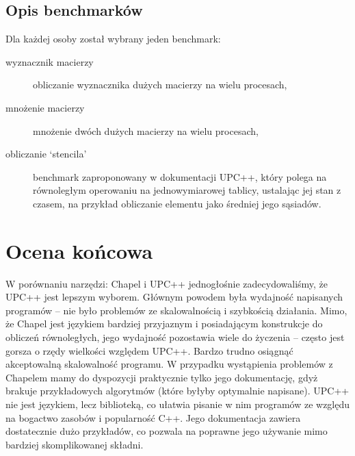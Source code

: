 \documentclass[twocolumn]{article}
\begin{document}
\subsection{Opis benchmarków}

Dla każdej osoby został wybrany jeden benchmark:
\begin{description}
\item[wyznacznik macierzy] obliczanie wyznacznika dużych macierzy na wielu
procesach,
\item[mnożenie macierzy] mnożenie dwóch dużych macierzy na wielu procesach,
\item[obliczanie `stencila'] benchmark zaproponowany w dokumentacji UPC++,
który polega na równoległym operowaniu na jednowymiarowej tablicy, ustalając jej
stan z czasem, na przykład obliczanie elementu jako średniej jego sąsiadów.

\end{description}





\section{Ocena końcowa}

W porównaniu narzędzi: Chapel i UPC++ jednogłośnie zadecydowaliśmy,
że UPC++ jest lepszym wyborem.
Głównym powodem była wydajność napisanych programów -- nie było
problemów ze skalowalnością i szybkością działania.
Mimo, że Chapel jest językiem bardziej przyjaznym i posiadającym
konstrukcje do obliczeń równoległych, jego wydajność pozostawia wiele do
życzenia -- często jest gorsza o rzędy wielkości względem UPC++.
Bardzo trudno osiągnąć akceptowalną skalowalność programu.
W przypadku wystąpienia problemów z Chapelem mamy do dyspozycji praktycznie
tylko jego dokumentację, gdyż brakuje przykładowych algorytmów (które byłyby
optymalnie napisane).
UPC++ nie jest językiem, lecz biblioteką, co ułatwia pisanie w nim
programów ze względu na bogactwo zasobów i popularność C++.
Jego dokumentacja zawiera dostatecznie dużo przykładów, co pozwala
na poprawne jego używanie mimo bardziej skomplikowanej składni.

\printbibliography
\end{document}
